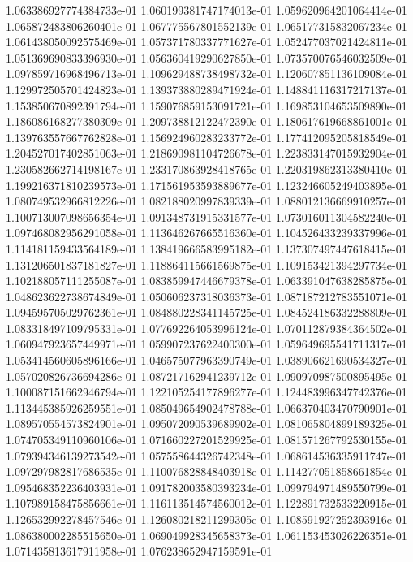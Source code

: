 1.063386927774384733e-01
1.060199381747174013e-01
1.059620964201064414e-01
1.065872483806260401e-01
1.067775567801552139e-01
1.065177315832067234e-01
1.061438050092575469e-01
1.057371780337771627e-01
1.052477037021424811e-01
1.051369690833396930e-01
1.056360419290627850e-01
1.073570076546032509e-01
1.097859716968496713e-01
1.109629488738498732e-01
1.120607851136109084e-01
1.129972505701424823e-01
1.139373880289471924e-01
1.148841116317217137e-01
1.153850670892391794e-01
1.159076859153091721e-01
1.169853104653509890e-01
1.186086168277380309e-01
1.209738812122472390e-01
1.180617619668861001e-01
1.139763557667762828e-01
1.156924960283233772e-01
1.177412095205818549e-01
1.204527017402851063e-01
1.218690981104726678e-01
1.223833147015932904e-01
1.230582662714198167e-01
1.233170863928418765e-01
1.220319862313380410e-01
1.199216371810239573e-01
1.171561953593889677e-01
1.123246605249403895e-01
1.080749532966812226e-01
1.082188020997839339e-01
1.088012136669910257e-01
1.100713007098656354e-01
1.091348731915331577e-01
1.073016011304582240e-01
1.097468082956291058e-01
1.113646267665516360e-01
1.104526433239337996e-01
1.114181159433564189e-01
1.138419666583995182e-01
1.137307497447618415e-01
1.131206501837181827e-01
1.118864115661569875e-01
1.109153421394297734e-01
1.102188057111255087e-01
1.083859947446679378e-01
1.063391047638285875e-01
1.048623622738674849e-01
1.050606237318036373e-01
1.087187212783551071e-01
1.094595705029762361e-01
1.084880228341145725e-01
1.084524186332288809e-01
1.083318497109795331e-01
1.077692264053996124e-01
1.070112879384364502e-01
1.060947923657449971e-01
1.059907237622400300e-01
1.059649695541711317e-01
1.053414560605896166e-01
1.046575077963390749e-01
1.038906621690534327e-01
1.057020826736694286e-01
1.087217162941239712e-01
1.090970987500895495e-01
1.100087151662946794e-01
1.122105254177896277e-01
1.124483996347742376e-01
1.113445385926259551e-01
1.085049654902478788e-01
1.066370403470790901e-01
1.089570554573824901e-01
1.095072090539689902e-01
1.081065804899189325e-01
1.074705349110960106e-01
1.071660227201529925e-01
1.081571267792530155e-01
1.079394346139273542e-01
1.057558644326742348e-01
1.068614536335911747e-01
1.097297982817686535e-01
1.110076828848403918e-01
1.114277051858661854e-01
1.095468352236403931e-01
1.091782003580393234e-01
1.099794971489550799e-01
1.107989158475856661e-01
1.116113514574560012e-01
1.122891732533220915e-01
1.126532992278457546e-01
1.126080218211299305e-01
1.108591927252393916e-01
1.086380002285515650e-01
1.069049928345658373e-01
1.061153453026226351e-01
1.071435813617911958e-01
1.076238652947159591e-01
